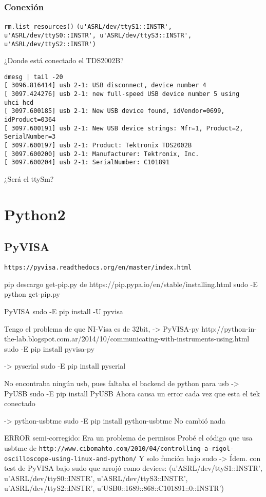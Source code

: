 \documentclass[a4paper]{article}
\begin{document}
\subsubsection{Conexión}
\verb"rm.list_resources()"
\verb"(u'ASRL/dev/ttyS1::INSTR', u'ASRL/dev/ttyS0::INSTR', u'ASRL/dev/ttyS3::INSTR', u'ASRL/dev/ttyS2::INSTR')"


¿Donde está conectado el TDS2002B?
\begin{verbatim}
dmesg | tail -20
[ 3096.816414] usb 2-1: USB disconnect, device number 4
[ 3097.424276] usb 2-1: new full-speed USB device number 5 using uhci_hcd
[ 3097.600185] usb 2-1: New USB device found, idVendor=0699, idProduct=0364
[ 3097.600191] usb 2-1: New USB device strings: Mfr=1, Product=2, SerialNumber=3
[ 3097.600197] usb 2-1: Product: Tektronix TDS2002B
[ 3097.600200] usb 2-1: Manufacturer: Tektronix, Inc.
[ 3097.600204] usb 2-1: SerialNumber: C101891
\end{verbatim}
¿Será el ttySm?




\section{Python2}\label{Python2}

\subsection{PyVISA}
\verb"https://pyvisa.readthedocs.org/en/master/index.html"

pip
    descargo get-pip.py de https://pip.pypa.io/en/stable/installing.html
    sudo -E python get-pip.py %

PyVISA
    sudo -E pip install -U pyvisa

Tengo el problema de que NI-Visa es de 32bit,
-> PyVISA-py
    http://python-in-the-lab.blogspot.com.ar/2014/10/communicating-with-instruments-using.html
    sudo -E pip install pyvisa-py

-> pyserial
    sudo -E pip install pyserial

No encontraba ningún usb, pues faltaba el backend de python para usb
->  PyUSB
    sudo -E pip install PyUSB
Ahora causa un error cada vez que esta el tek conectado

-> python-usbtmc
    sudo -E pip install python-usbtmc
No cambió nada

ERROR semi-corregido: Era un problema de permisos
    Probé el código que usa usbtmc de \verb"http://www.cibomahto.com/2010/04/controlling-a-rigol-oscilloscope-using-linux-and-python/"
    Y solo función bajo sudo -> Ídem. con test de PyVISA bajo sudo que arrojó como devices:
        (u'ASRL/dev/ttyS1::INSTR', u'ASRL/dev/ttyS0::INSTR', u'ASRL/dev/ttyS3::INSTR', u'ASRL/dev/ttyS2::INSTR', u'USB0::1689::868::C101891::0::INSTR')
\end{document}
